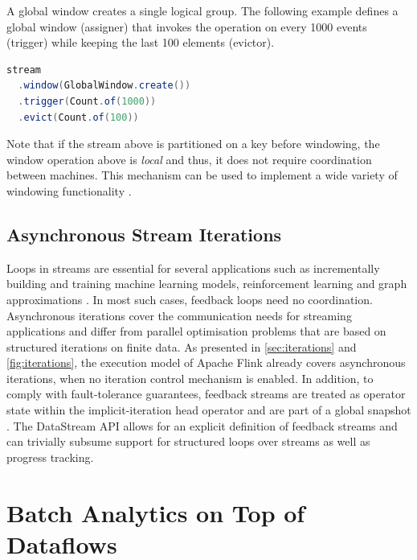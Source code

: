 \documentclass[11pt]{article}
\begin{document}
\noindent A global window creates a single logical group. The following example defines a global window (assigner) that invokes the operation on every 1000 events (trigger) while keeping the last 100 elements (evictor). 

\begin{lstlisting}[language=Java]
stream
  .window(GlobalWindow.create())
  .trigger(Count.of(1000))
  .evict(Count.of(100))
\end{lstlisting}

Note that if the stream above is partitioned on a key before  windowing, the window operation above is \textit{local} and thus, it does not require coordination between machines. This mechanism can be used to implement a wide variety of windowing functionality \cite{akidau2015dataflow}. 

\subsection{Asynchronous Stream Iterations}
\label{sec:stream-iterations}
Loops in streams are essential for several applications such as incrementally building and training machine learning models, reinforcement learning and graph approximations \cite{feigenbaum2005graph,chandramouli2009fly}.
In most such cases, feedback loops need no coordination. Asynchronous iterations cover the communication needs for streaming applications and differ from parallel optimisation problems that are based on structured iterations on finite data. As presented in \autoref{sec:iterations} and \autoref{fig:iterations}, the execution model of Apache Flink already covers asynchronous iterations, when no iteration control mechanism is enabled. In addition, to comply with fault-tolerance guarantees, feedback streams are treated as operator state within the implicit-iteration head operator and are part of a global snapshot \cite{carbone2015lightweight}. The DataStream API allows for an explicit definition of feedback streams and can trivially subsume support for structured loops over streams\cite{murray2013naiad} as well as progress tracking\cite{chandramouli2009fly}.



\vspace{-3mm}
\section{Batch Analytics on Top of Dataflows}
\label{sec:batch}
\end{document}
